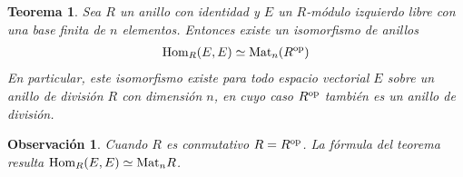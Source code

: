 \documentclass{report}
\newcommand{\Hom}{\textnormal{Hom}}
\newcommand{\Mat}{\textnormal{Mat}}
\newtheorem{theorem}{Teorema}
\newtheorem{remark}{Observación}
\begin{document}
  \newpage

  \begin{theorem}
    \label{theorem:isomorphismBetweenMatrixAndHomomorphismRings}
    Sea \(R\) un anillo con identidad y \(E\) un \(R\)-módulo izquierdo libre con una base finita de \(n\) elementos.
    Entonces existe un isomorfismo de anillos
    \begin{align}
      \Hom_R(E, E)
      \simeq
      \Mat_n(R^{\textnormal{op}})
    \end{align}
    En particular, este isomorfismo existe para todo espacio vectorial \(E\) sobre un anillo de división \(R\) con dimensión \(n\), en cuyo caso \(R^{\textnormal{op}}\) también es un anillo de división.
  \end{theorem}
  \begin{remark}
    Cuando \(R\) es conmutativo \(R = R^{\textnormal{op}}\).
    La fórmula del teorema resulta \(\Hom_R(E, E) \simeq \Mat_n R\).
  \end{remark}
\end{document}
